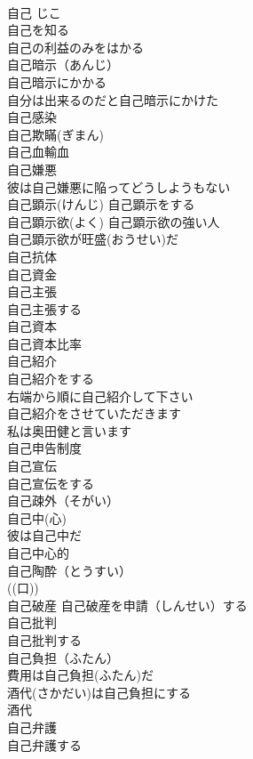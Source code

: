 \documentclass[8pt]{extreport}
\begin{document}
\begin{CJK}{UTF8}{min}
\\	自己	じこ	
\\	自己を知る 
\\	自己の利益のみをはかる 
\\	自己暗示（あんじ） 
\\	自己暗示にかかる 
\\	自分は出来るのだと自己暗示にかけた 
\\	自己感染 
\\	自己欺瞞(ぎまん) 
\\	自己血輸血 
\\	自己嫌悪 
\\	彼は自己嫌悪に陥ってどうしようもない 
\\	自己顕示(けんじ) 自己顕示をする 
\\	自己顕示欲(よく) 自己顕示欲の強い人 
\\	自己顕示欲が旺盛(おうせい)だ 
\\	自己抗体 
\\	自己資金 
\\	自己主張 
\\	自己主張する 
\\	自己資本 
\\	自己資本比率 
\\	自己紹介 
\\	自己紹介をする 
\\	右端から順に自己紹介して下さい 
\\	自己紹介をさせていただきます
\\	私は奥田健と言います 
\\	自己申告制度 
\\	自己宣伝 
\\	自己宣伝をする 
\\	自己疎外（そがい） 
\\	自己中(心) 
\\	彼は自己中だ 
\\	自己中心的 
\\	自己陶酔（とうすい） 
\\	((口)) 
\\	自己破産 自己破産を申請（しんせい）する 
\\	自己批判 
\\	自己批判する 
\\	自己負担（ふたん） 
\\	費用は自己負担(ふたん)だ 
\\	酒代(さかだい)は自己負担にする 
\\	酒代　
\\	自己弁護 
\\	自己弁護する 

\end{CJK}
\end{document}
